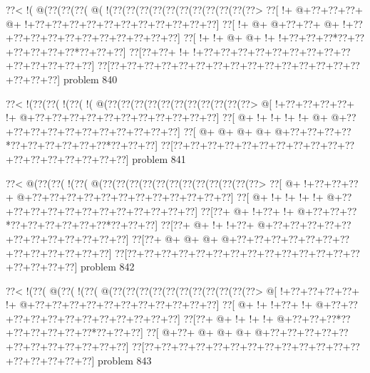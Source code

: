 \vbox{\vbox{\goo
\0??<\- !(\- @(\0??(\0??(\0??(\- @(\- !(\0??(\0??(\0??(\0??(\0??(\0??(\0??(\0??(\0??(\0??(\0??>
\0??[\- !+\- @+\0??+\0??+\0??+\- @+\- !+\0??+\0??+\0??+\0??+\0??+\0??+\0??+\0??+\0??+\0??+\0??]
\0??[\- !+\- @+\- @+\0??+\0??+\- @+\- !+\0??+\0??+\0??+\0??+\0??+\0??+\0??+\0??+\0??+\0??+\0??]
\0??[\- !+\- !+\- @+\- @+\- !+\- !+\0??+\0??+\0??*\0??+\0??+\0??+\0??+\0??+\0??*\0??+\0??+\0??]
\0??[\0??+\0??+\- !+\- !+\0??+\0??+\0??+\0??+\0??+\0??+\0??+\0??+\0??+\0??+\0??+\0??+\0??+\0??]
\0??[\0??+\0??+\0??+\0??+\0??+\0??+\0??+\0??+\0??+\0??+\0??+\0??+\0??+\0??+\0??+\0??+\0??+\0??]
}
\hfil problem 840\hfil\break
}



\vbox{\vbox{\goo
\0??<\- !(\0??(\0??(\- !(\0??(\- !(\- @(\0??(\0??(\0??(\0??(\0??(\0??(\0??(\0??(\0??(\0??(\0??>
\- @[\- !+\0??+\0??+\0??+\0??+\- !+\- @+\0??+\0??+\0??+\0??+\0??+\0??+\0??+\0??+\0??+\0??+\0??]
\0??[\- @+\- !+\- !+\- !+\- !+\- @+\- @+\0??+\0??+\0??+\0??+\0??+\0??+\0??+\0??+\0??+\0??+\0??]
\0??[\- @+\- @+\- @+\- @+\- @+\0??+\0??+\0??+\0??*\0??+\0??+\0??+\0??+\0??+\0??*\0??+\0??+\0??]
\0??[\0??+\0??+\0??+\0??+\0??+\0??+\0??+\0??+\0??+\0??+\0??+\0??+\0??+\0??+\0??+\0??+\0??+\0??]
}
\hfil problem 841\hfil\break
}



\vbox{\vbox{\goo
\0??<\- @(\0??(\0??(\- !(\0??(\- @(\0??(\0??(\0??(\0??(\0??(\0??(\0??(\0??(\0??(\0??(\0??(\0??>
\0??[\- @+\- !+\0??+\0??+\0??+\- @+\0??+\0??+\0??+\0??+\0??+\0??+\0??+\0??+\0??+\0??+\0??+\0??]
\0??[\- @+\- !+\- !+\- !+\- !+\- @+\0??+\0??+\0??+\0??+\0??+\0??+\0??+\0??+\0??+\0??+\0??+\0??]
\0??[\0??+\- @+\- !+\0??+\- !+\- @+\0??+\0??+\0??*\0??+\0??+\0??+\0??+\0??+\0??*\0??+\0??+\0??]
\0??[\0??+\- @+\- !+\- !+\0??+\- @+\0??+\0??+\0??+\0??+\0??+\0??+\0??+\0??+\0??+\0??+\0??+\0??]
\0??[\0??+\- @+\- @+\- @+\- @+\0??+\0??+\0??+\0??+\0??+\0??+\0??+\0??+\0??+\0??+\0??+\0??+\0??]
\0??[\0??+\0??+\0??+\0??+\0??+\0??+\0??+\0??+\0??+\0??+\0??+\0??+\0??+\0??+\0??+\0??+\0??+\0??]
}
\hfil problem 842\hfil\break
}



\vbox{\vbox{\goo
\0??<\- !(\0??(\- @(\0??(\- !(\0??(\- @(\0??(\0??(\0??(\0??(\0??(\0??(\0??(\0??(\0??(\0??(\0??>
\- @[\- !+\0??+\0??+\0??+\0??+\- !+\- @+\0??+\0??+\0??+\0??+\0??+\0??+\0??+\0??+\0??+\0??+\0??]
\0??[\- @+\- !+\- !+\0??+\- !+\- @+\0??+\0??+\0??+\0??+\0??+\0??+\0??+\0??+\0??+\0??+\0??+\0??]
\0??[\0??+\- @+\- !+\- !+\- !+\- @+\0??+\0??+\0??*\0??+\0??+\0??+\0??+\0??+\0??*\0??+\0??+\0??]
\0??[\- @+\0??+\- @+\- @+\- @+\- @+\0??+\0??+\0??+\0??+\0??+\0??+\0??+\0??+\0??+\0??+\0??+\0??]
\0??[\0??+\0??+\0??+\0??+\0??+\0??+\0??+\0??+\0??+\0??+\0??+\0??+\0??+\0??+\0??+\0??+\0??+\0??]
}
\hfil problem 843\hfil\break
}




